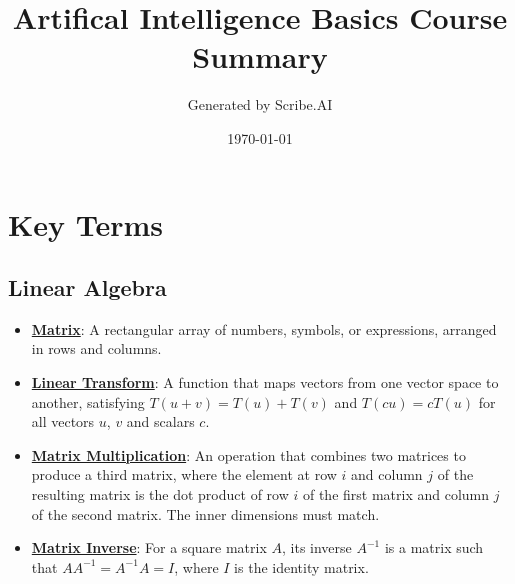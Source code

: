 \documentclass{article}%
\title{Artifical Intelligence Basics Course Summary}%
\author{Generated by Scribe.AI}%
\date{\today}%
\begin{document}
%
\normalsize%
\maketitle%
\section{Key Terms}%
\label{sec:KeyTerms}%
\subsection{Linear Algebra}%
\label{subsec:LinearAlgebra}%
\begin{itemize}[leftmargin=*]%
\item \href{https://purdue.brightspace.com/d2l/common/assets/pdfjs-d2l-dist/1.0.14-legacy/web/viewer.html?file=\%2Fcontent\%2Fenforced\%2F1095467-wl.202510.CS.24300.001\%2F04L1-Linear Algebra Primer.pdf\%3Fou\%3D1095467\&lang=en-us\&container=d2l-fileviewer-rendered-pdf\&fullscreen=d2l-fileviewer-rendered-pdf-dialog\&height=667#page=4}{\textbf{Matrix}}: A rectangular array of numbers, symbols, or expressions, arranged in rows and columns.%
\item \href{https://purdue.brightspace.com/d2l/common/assets/pdfjs-d2l-dist/1.0.14-legacy/web/viewer.html?file=\%2Fcontent\%2Fenforced\%2F1095467-wl.202510.CS.24300.001\%2F04L1-Linear Algebra Primer.pdf\%3Fou\%3D1095467\&lang=en-us\&container=d2l-fileviewer-rendered-pdf\&fullscreen=d2l-fileviewer-rendered-pdf-dialog\&height=667#page=5}{\textbf{Linear Transform}}: A function that maps vectors from one vector space to another, satisfying $T(u + v) = T(u) + T(v)$ and $T(cu) = cT(u)$ for all vectors $u$, $v$ and scalars $c$.%
\item \href{https://purdue.brightspace.com/d2l/common/assets/pdfjs-d2l-dist/1.0.14-legacy/web/viewer.html?file=\%2Fcontent\%2Fenforced\%2F1095467-wl.202510.CS.24300.001\%2F04L1-Linear Algebra Primer.pdf\%3Fou\%3D1095467\&lang=en-us\&container=d2l-fileviewer-rendered-pdf\&fullscreen=d2l-fileviewer-rendered-pdf-dialog\&height=667#page=14}{\textbf{Matrix Multiplication}}: An operation that combines two matrices to produce a third matrix, where the element at row $i$ and column $j$ of the resulting matrix is the dot product of row $i$ of the first matrix and column $j$ of the second matrix. The inner dimensions must match.%
\item \href{https://purdue.brightspace.com/d2l/common/assets/pdfjs-d2l-dist/1.0.14-legacy/web/viewer.html?file=\%2Fcontent\%2Fenforced\%2F1095467-wl.202510.CS.24300.001\%2F04L1-Linear Algebra Primer.pdf\%3Fou\%3D1095467\&lang=en-us\&container=d2l-fileviewer-rendered-pdf\&fullscreen=d2l-fileviewer-rendered-pdf-dialog\&height=667#page=10}{\textbf{Matrix Inverse}}: For a square matrix $A$, its inverse $A^{-1}$ is a matrix such that $AA^{-1} = A^{-1}A = I$, where $I$ is the identity matrix.%

\end{itemize}
\end{document}
